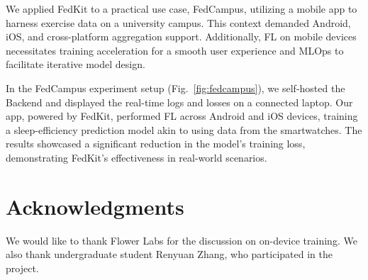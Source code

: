\documentclass[letterpaper]{article} %
\begin{document}
We applied FedKit to a practical use case, FedCampus,
utilizing a mobile app to harness exercise data on a university campus.
This context demanded Android, iOS, and cross-platform aggregation support.
Additionally,
FL on mobile devices necessitates training acceleration for
a smooth user experience
and MLOps to facilitate iterative model design.

In the FedCampus experiment setup (Fig.~\ref{fig:fedcampus}),
we self-hosted the Backend
and displayed the real-time logs and losses on a connected laptop.
Our app, powered by FedKit,
performed FL across Android and iOS devices,
training a sleep-efficiency prediction model
akin to \cite{khoa2022fedmcrnn}
using data from the smartwatches.
The results showcased a significant reduction in the model's training loss,
demonstrating FedKit's effectiveness in real-world scenarios.

\appendix

\section*{Acknowledgments}
We would like to thank Flower Labs for the discussion on on-device training.
We also thank undergraduate student Renyuan Zhang,
who participated in the project.

\bigskip


\end{document}
